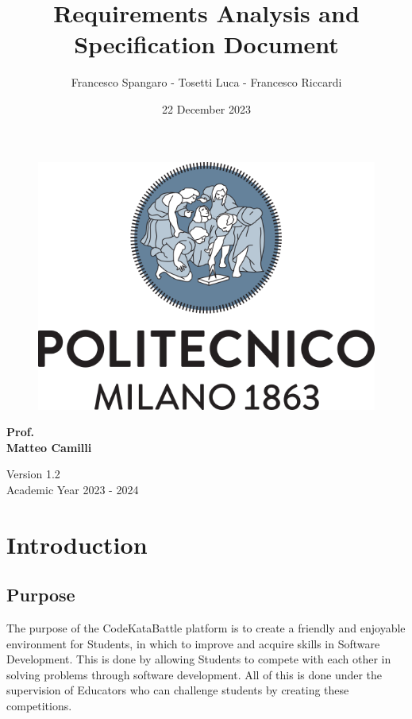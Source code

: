 \documentclass{article}
\title{\Huge{\textbf{Requirements Analysis and Specification Document}}}
\author{\Large{Francesco Spangaro - Tosetti Luca - Francesco Riccardi}}
\date{22 December 2023}
\begin{document}
\maketitle

\begin{figure}[h]
    \centering
    \includegraphics[scale=0.6]{politecnico-di-milano-logo.png}
\end{figure}

\vspace*{0.5cm}
\begin{center}
      \Large{\textbf{Prof.}} \\
      \Large{\textbf{Matteo Camilli}}
\end{center}
\vspace*{0.5cm}

\begin{center}
      \large{Version 1.2} \\
      \large{Academic Year 2023 - 2024}
\end{center}

\newpage

\tableofcontents

\newpage

\pagestyle{IntroductionStyle}

\section{Introduction}
\subsection{Purpose}
The purpose of the CodeKataBattle platform is to create a friendly and enjoyable environment for Students, in which
to improve and acquire skills in Software Development. 
This is done by allowing Students to compete with each other in solving problems through software development.
All of this is done under the supervision of Educators who can challenge students by creating these competitions.
\end{document}
